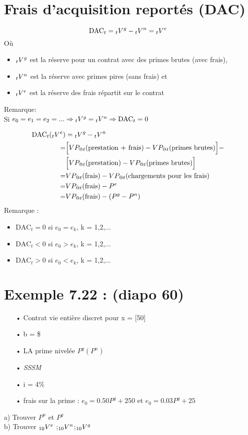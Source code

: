 \documentclass[11pt,french]{report}
\newcommand{\indiceGauche}[2]{{\vphantom{#2}}_{#1}#2}
\begin{document}
\section{Frais d'acquisition reportés (DAC)}
\begin{equation}
\text{DAC}_t = \indiceGauche{t}{V}^{g} - \indiceGauche{t}{V}^{n} = \indiceGauche{t}{V}^{e}
\end{equation}
Où 
\begin{itemize}
\item $\indiceGauche{t}{V}^{g}$ est la réserve pour un contrat avec des primes brutes (avec frais),
\item $\indiceGauche{t}{V}^{n}$ est la réserve avec primes pires (sans frais) et
\item $\indiceGauche{t}{V}^{e}$ est la réserve des frais répartit sur le contrat
\end{itemize}
Remarque:\\
Si $e_0 = e_1 = e_2 = ...\Rightarrow \indiceGauche{t}{V}^{g} = \indiceGauche{t}{V}^{n} \Rightarrow \text{DAC}_t =0$

\begin{align*}
\text{DAC}_t(\indiceGauche{t}{V}^{e}) &= \indiceGauche{t}{V}^{g} - \indiceGauche{t}{V}^{n} \\
=& \Big[ VP_{@t}(\text{prestation + frais}) - VP_{@t}(\text{primes brutes}) \Big] - \\ 
& \Big[ VP_{@t}(\text{prestation}) - VP_{@t}(\text{primes brutes}) \Big] \\
=& VP_{@t}( \text{frais}) - VP_{@t}(\text{chargements pour les frais}) \\
=& VP_{@t}( \text{frais}) - P^{e} \\
=& VP_{@t}( \text{frais}) - (P^{g} - P^{n}) 
\end{align*}
Remarque :\\
\begin{itemize}
\item $\text{DAC}_t = 0$ si $e_0 = e_k$, k = 1,2,...
\item $\text{DAC}_t < 0$ si $e_0 > e_k$, k = 1,2,...
\item $\text{DAC}_t > 0$ si $e_0 < e_k$, k = 1,2,...
\end{itemize}

\section{Exemple 7.22 : (diapo 60)}
\label{ex.7.22}
\begin{itemize}
\item[•] Contrat vie entière discret pour x = [50]
\item[•] b = \$ 
\item[•] LA prime nivelée $P^g(P^n)$ 
\item[•] \emph{SSSM}
\item[•] i = 4\%
\item[•] frais sur la prime : $e_0 = 0.50P^g +250$ et $e_0 = 0.03P^g +25$
\end{itemize}
a) Trouver $P^n$ et $P^g$\\
b) Trouver $ \indiceGauche{10}{V}^e$ ;$ \indiceGauche{10}{V}^n$;$ \indiceGauche{10}{V}^g$
\end{document}
